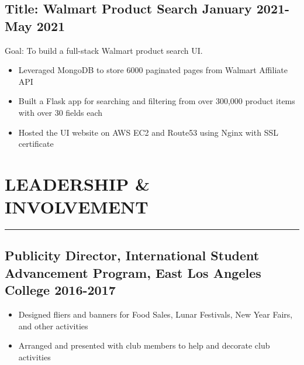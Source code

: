 \documentclass[12pt]{article}
\newcommand{\divider}{\vskip2pt{\color{black}\hrule}\vskip2pt}
\begin{document}
\subsection*{Title: Walmart Product Search \hfill {\normalfont January 2021-May 2021}}
\noindent
\href{https://github.com/Anthonyive/DSCI-551-Project.git}{} Goal: To build a full-stack Walmart product search UI.
\begin{itemize}
    \setlength\itemsep{-1pt}
    \item Leveraged MongoDB to store 6000 paginated pages from Walmart 
        Affiliate API
    \item Built a Flask app for searching and filtering from over 300,000 
        product items with over 30 fields each
    \item Hosted the UI website on AWS EC2 and Route53 using Nginx with SSL 
        certificate
\end{itemize}


\section*{LEADERSHIP \& INVOLVEMENT}
\divider
\subsection*{Publicity Director{\normalfont, International Student Advancement Program, East Los Angeles College \hfill	2016-2017}}
\begin{itemize}
    \setlength\itemsep{-1pt}
    \item Designed fliers and banners for Food Sales, Lunar Festivals, 
        New Year Fairs, and other activities
    \item Arranged and presented with club members to help and decorate 
        club activities
\end{itemize}
\end{document}
